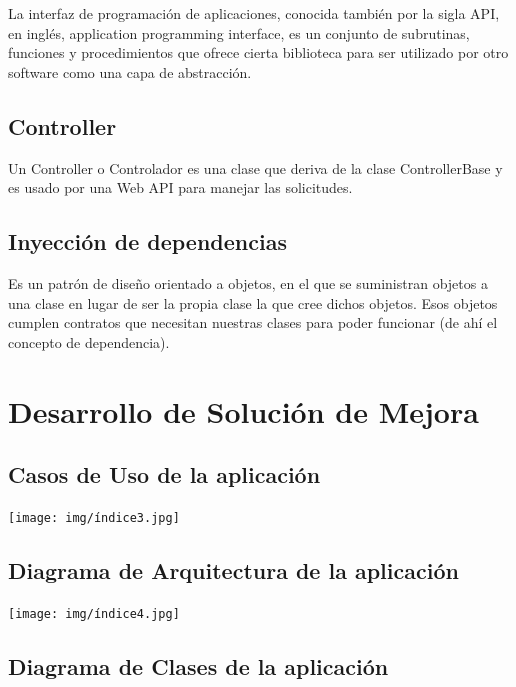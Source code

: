 \documentclass[12pt,letterpaper]{article}
\begin{document}
La interfaz de programación de aplicaciones, conocida también por la sigla API, en inglés, application programming interface, es un conjunto de subrutinas, funciones y procedimientos que ofrece cierta biblioteca para ser utilizado por otro software como una capa de abstracción.

\subsection{Controller}

Un Controller o Controlador es una clase que deriva de la clase ControllerBase y es usado por una Web API para manejar las solicitudes.

\subsection{Inyección de dependencias}

Es un patrón de diseño orientado a objetos, en el que se suministran objetos a una clase en lugar de ser la propia clase la que cree dichos objetos. Esos objetos cumplen contratos que necesitan nuestras clases para poder funcionar (de ahí el concepto de dependencia).

\section{ Desarrollo de Solución de Mejora}

\subsection{Casos de Uso de la aplicación}

\begin{center}
    \texttt{[image: img/índice3.jpg]}  
\end{center}

\subsection{Diagrama de Arquitectura de la aplicación}

\begin{center}
    \texttt{[image: img/índice4.jpg]}  
\end{center}

\subsection{Diagrama de Clases de la aplicación}
\end{document}
